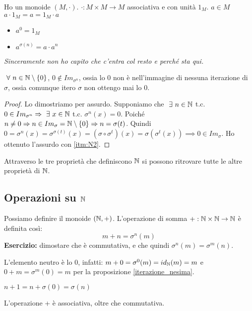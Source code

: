 \begin{defn}[Potenze]
Ho un monoide $(M, \cdot)$. $\cdot : M \times M \to M $ associativa e con unit\`a $1_M$. $a \in M$ $a \cdot 1_M = a = 1_M \cdot a$
\begin{itemize}
  \item $a^0 = 1_M$
  \item $a^{\sigma(n)} = a \cdot a^n$
\end{itemize}
\textit{Sinceramente non ho capito che c'entra col resto e perch\'e sta qui.}
\end{defn}

\begin{prop}
$\forall n \in \naturals \setminus \{ 0 \}$, $0 \notin Im_{\sigma^n}$, ossia lo 0 non \`e nell'immagine di nessuna iterazione di $\sigma$, ossia comunque itero $\sigma$ non ottengo mai lo 0.
\end{prop}
\begin{proof}
Lo dimostriamo per assurdo. Supponiamo che $\exists n \in \naturals$ t.c. $0 \in Im_{\sigma^n} \implies \exists x \in \naturals$ t.c. $\sigma^n (x) = 0$. Poich\'e $n \neq 0 \Rightarrow n \in Im_{\sigma} = \mathbb{N} \setminus \{ 0 \} \Rightarrow n = \sigma(t)$. Quindi $0 = \sigma^n(x) = \sigma^{\sigma(t)}(x) = (\sigma \circ \sigma^t)(x) = \sigma(\sigma^t(x)) \implies 0 \in Im_{\sigma}$. Ho ottenuto l'assurdo con \ref{itm:N2}.
\end{proof}
Attraverso le tre propriet\`a che definiscono $\mathbb{N}$ si possono ritrovare tutte le altre propriet\`a di $\mathbb{N}$. 

\subsection{Operazioni su $\mathbb{N}$}

Possiamo definire il monoide $(\mathbb{N}, +)$. L'operazione di somma $+ : \mathbb{N} \times \mathbb{N} \to \mathbb{N}$ \`e definita cos\`i:
\[
m + n = \sigma^{n}(m)
\]
\textbf{Esercizio:} dimostare che \`e commutativa, e che quindi $\sigma^n(m) = \sigma^m(n)$. \vspace{5cm}

L'elemento neutro \`e lo 0, infatti: $ m + 0 = \sigma^0 (m) = id_{\mathbb{N}} (m) = m $ e $ 0 + m = \sigma^m (0) = m $ per la proposizione \ref{iterazione_nesima}.

\begin{oss}
$n + 1 = n + \sigma(0) = \sigma(n)$
\end{oss}

L'operazione + \`e associativa, oltre che commutativa. 


